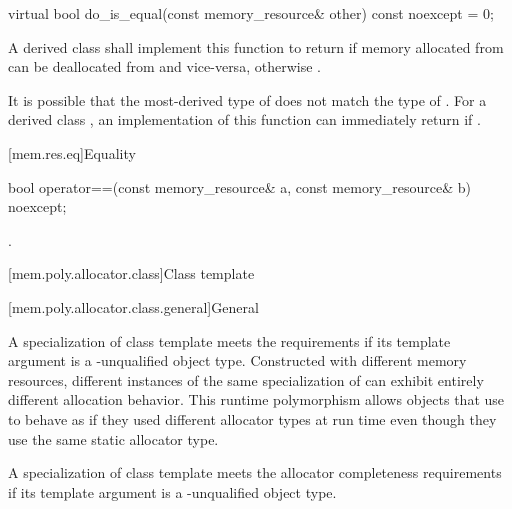%
\begin{itemdecl}
virtual bool do_is_equal(const memory_resource& other) const noexcept = 0;
\end{itemdecl}

\begin{itemdescr}
\pnum
\returns
A derived class shall implement this function to return  if memory allocated from  can be deallocated from  and vice-versa,
otherwise .
\begin{note}
It is possible that the most-derived type of  does not match the type of .
For a derived class , an implementation of this function
can immediately return 
if .
\end{note}
\end{itemdescr}

[mem.res.eq]{Equality}

%
\begin{itemdecl}
bool operator==(const memory_resource& a, const memory_resource& b) noexcept;
\end{itemdecl}

\begin{itemdescr}
\pnum
\returns
{}.
\end{itemdescr}

[mem.poly.allocator.class]{Class template }

[mem.poly.allocator.class.general]{General}

\pnum
A specialization of class template  meets
the  requirements
if its template argument is a \cv-unqualified object type.
Constructed with different memory resources,
different instances of the same specialization of 
can exhibit entirely different allocation behavior.
This runtime polymorphism allows objects that use 
to behave as if they used different allocator types at run time
even though they use the same static allocator type.

\pnum
A specialization of class template 
meets the allocator completeness requirements
if its template argument is a \cv-unqualified object type.

